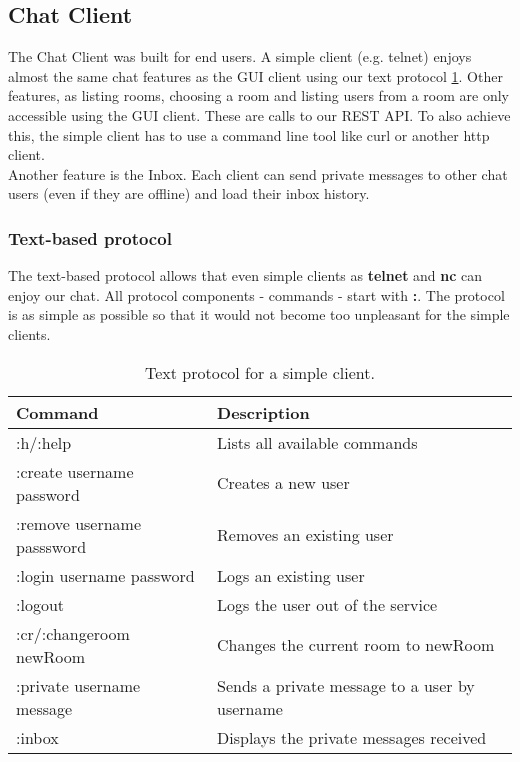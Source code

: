 \subsection{Chat Client}
\label{subsec:chatclient}
The Chat Client was built for end users. A simple client (e.g. telnet) enjoys almost the same chat features as the GUI client using our text protocol \ref{tab:textprotocol}.
Other features, as listing rooms, choosing a room
and listing users from a room are only accessible using the GUI client. These are calls to our REST API. To also achieve this, the simple client has to use a command line tool like curl or another http client. \\
Another feature is the Inbox. Each client can send private messages to other chat users (even if they are offline) and load their inbox history.

\subsubsection{Text-based protocol}
\label{subsec:textprotocol}
The text-based protocol allows that even simple clients as \textbf{telnet} and \textbf{nc} can enjoy our chat. All protocol components - commands -  start with \textbf{:}. The protocol is as simple as possible so that it would not become too unpleasant for the simple clients.


\begin{table}[h]
\centering
\begin{tabular}{l|l}
\textbf{Command} & \textbf{Description}\\
\hline
\hline
 :h/:help & Lists all available commands \\
 \hline
 :create username password & Creates a new user\\
 \hline
 :remove username passsword & Removes an existing user \\
 \hline
 :login username password & Logs an existing user \\
 \hline 
 :logout & Logs the user out of the service \\
 \hline
 :cr/:changeroom newRoom & Changes the current room to newRoom  \\
 \hline
 :private username message & Sends a private message to a user by username   \\
 \hline
 :inbox & Displays the private messages received
\end{tabular}

\caption{Text protocol for a simple client.}
\label{tab:textprotocol}
\end{table}


